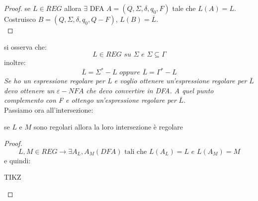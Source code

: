 \begin{proof}
	se $L\in REG$ allora $\exists$ DFA $A=(Q, \Sigma, \delta, q_0, F)$ tale che $L(A)=L$. Costruisco $B=(Q,\Sigma, \delta,q_0, Q-F),\,	 L(B)=\overline{L}$.\\
\end{proof}
si osserva che:
$$L\in REG\,\,su\,\, \Sigma\,\,e\,\, \Sigma\subseteq \Gamma$$
inoltre:
$$\overline{L}=\Sigma^*-L\,\,oppure\,\, \overline{L}=\Gamma^*-L$$
\textit{Se ho un espressione regolare per L e voglio ottenere un'espressione regolare per }$\overline{L}$\textit{ devo ottenere un }$\varepsilon-NFA$\textit{ che devo convertire in DFA. A quel punto complemento con F e ottengo un'espressione regolare per }$\overline{L}$.\\
Passiamo ora all'intersezione:
\begin{theorem}
	se $L$ e $M$ sono regolari allora la loro intersezione è regolare
\end{theorem}
\begin{proof}
	$$L,M\in REG\to \exists A_L,A_M(DFA) \mbox{ tali che }L(A_L)=L\,\,e\,\, L(A_M)=M$$
	e quindi:
	\begin{center}
		TIKZ
	\end{center}
\end{proof}
